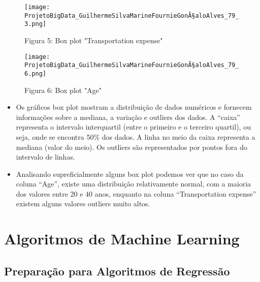 \documentclass[11pt]{article}
\providecommand{\tightlist}{%
      \setlength{\itemsep}{0pt}\setlength{\parskip}{0pt}}
\begin{document}
\begin{figure}[h]
   \centering
   \texttt{[image: ProjetoBigData\_GuilhermeSilvaMarineFournieGonÃ§aloAlves\_79\_3.png]}
   \pagebreak
    \caption{Figura 5: Box plot "Transportation expense"}
    \pagebreak
   \label{fig:boxplot1}
\end{figure}

\begin{figure}[h]
   \centering
   \texttt{[image: ProjetoBigData\_GuilhermeSilvaMarineFournieGonÃ§aloAlves\_79\_6.png]}
   \pagebreak
    \caption{Figura 6: Box plot "Age"}
    \pagebreak
   \label{fig:boxplot2}
\end{figure}

    \begin{itemize}
\tightlist
\item
  Os gráficos box plot mostram a distribuição de dados numéricos e
  fornecem informações sobre a mediana, a variação e outliers dos dados.
  A ``caixa'' representa o intervalo interquartil (entre o primeiro e o
  terceiro quartil), ou seja, onde se encontra 50\% dos dados. A linha
  no meio da caixa representa a mediana (valor do meio). Os outliers são
  representados por pontos fora do intervalo de linhas.
\item
  Analisando supreficialmente alguns box plot podemos ver que no caso da
  coluna ``Age'', existe uma distribuição relativamente normal, com a
  maioria dos valores entre 20 e 40 anos, enquanto na coluna
  ``Transportation expense'' existem alguns valores outliers muito
  altos.
\end{itemize}

    \hypertarget{algoritmos-de-machine-learning}{%
\section{Algoritmos de Machine
Learning}\label{algoritmos-de-machine-learning}}

    \hypertarget{preparauxe7uxe3o-para-algoritmos-de-regressuxe3o}{%
\subsection{Preparação para Algoritmos de
Regressão}\label{preparauxe7uxe3o-para-algoritmos-de-regressuxe3o}}
        
\end{document}
